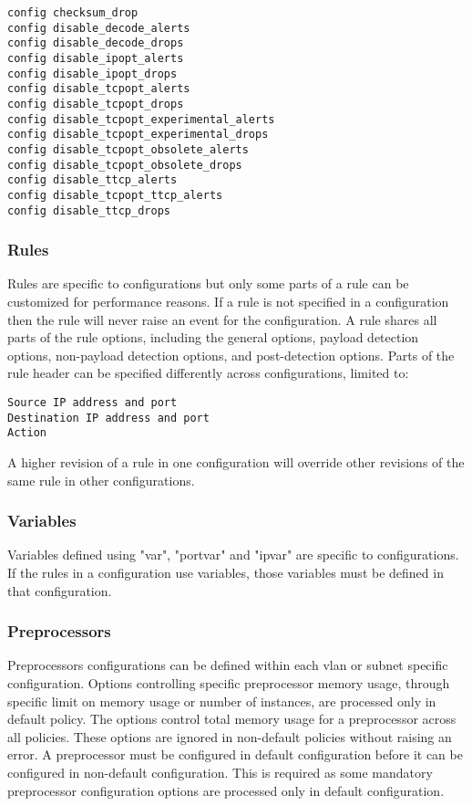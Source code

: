 \documentclass[english]{report}
\begin{document}
\begin{verbatim}
config checksum_drop
config disable_decode_alerts
config disable_decode_drops
config disable_ipopt_alerts
config disable_ipopt_drops
config disable_tcpopt_alerts
config disable_tcpopt_drops
config disable_tcpopt_experimental_alerts
config disable_tcpopt_experimental_drops
config disable_tcpopt_obsolete_alerts
config disable_tcpopt_obsolete_drops
config disable_ttcp_alerts
config disable_tcpopt_ttcp_alerts
config disable_ttcp_drops
\end{verbatim}

\subsubsection{Rules}
Rules are specific to configurations but only some parts of a rule can be customized 
for performance reasons. If a rule is not specified in a configuration then the rule 
will never raise an event for the configuration. A rule shares all parts of the rule 
options, including the general options, payload detection options, non-payload detection 
options, and post-detection options.  Parts of the rule header can be specified differently 
across configurations, limited to:

\begin{verbatim}
Source IP address and port
Destination IP address and port
Action
\end{verbatim}

A higher revision of a rule in one configuration will override other revisions of 
the same rule in other configurations.

\subsubsection{Variables}
Variables defined using "var", "portvar" and "ipvar" are specific to configurations. 
If the rules in a configuration use variables, those variables must be defined in 
that configuration. 

\subsubsection{Preprocessors}
Preprocessors configurations can be defined within each vlan or subnet specific 
configuration. Options controlling specific preprocessor memory usage, through specific 
limit on memory usage or number of instances, are processed only in default policy. 
The options control total memory usage for a preprocessor across all policies. These 
options are ignored in non-default policies without raising an error. A preprocessor 
must be configured in default configuration before it can be configured in non-default 
configuration. This is required as some mandatory preprocessor configuration options 
are processed only in default configuration.
\end{document}
